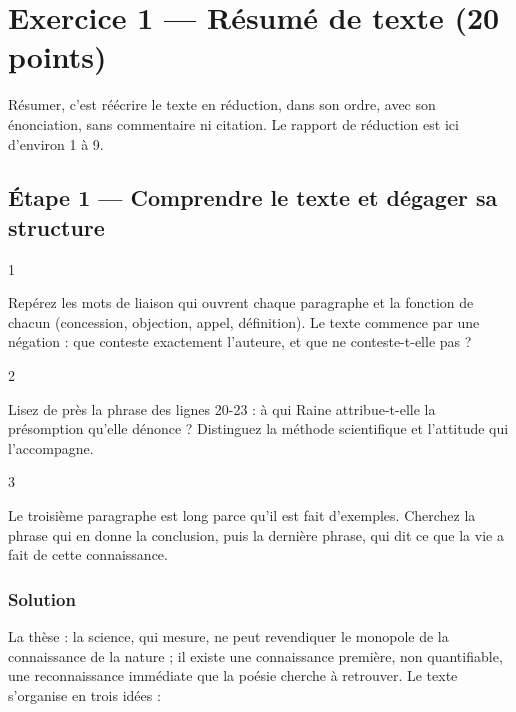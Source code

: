 \documentclass[11pt,a4paper]{article}
\begin{document}
\hypertarget{exercice-1-ruxe9sumuxe9-de-texte-20-points}{%
\section{Exercice 1 --- Résumé de texte (20 points)}\label{exercice-1-ruxe9sumuxe9-de-texte-20-points}}

Résumer, c'est réécrire le texte en réduction, dans son ordre, avec son énonciation, sans commentaire ni citation. Le rapport de réduction est ici d'environ 1 à 9.

\hypertarget{uxe9tape-1-comprendre-le-texte-et-duxe9gager-sa-structure}{%
\subsection{Étape 1 --- Comprendre le texte et dégager sa structure}\label{uxe9tape-1-comprendre-le-texte-et-duxe9gager-sa-structure}}

\begin{indication}{1}

Repérez les mots de liaison qui ouvrent chaque paragraphe et la fonction de chacun (concession, objection, appel, définition). Le texte commence par une négation : que conteste exactement l'auteure, et que ne conteste-t-elle pas ?

\end{indication}

\begin{indication}{2}

Lisez de près la phrase des lignes 20-23 : à qui Raine attribue-t-elle la présomption qu'elle dénonce ? Distinguez la méthode scientifique et l'attitude qui l'accompagne.

\end{indication}

\begin{indication}{3}

Le troisième paragraphe est long parce qu'il est fait d'exemples. Cherchez la phrase qui en donne la conclusion, puis la dernière phrase, qui dit ce que la vie a fait de cette connaissance.

\end{indication}

\hypertarget{solution}{%
\subsubsection{Solution}\label{solution}}

La thèse : la science, qui mesure, ne peut revendiquer le monopole de la connaissance de la nature ; il existe une connaissance première, non quantifiable, une reconnaissance immédiate que la poésie cherche à retrouver. Le texte s'organise en trois idées :
\end{document}
